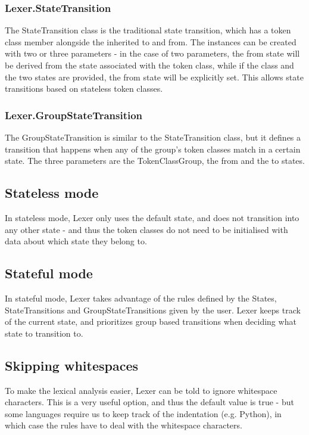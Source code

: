 \subsubsection{Lexer.StateTransition}
The StateTransition class is the traditional state transition, which has a token class member alongside the inherited to and from. The instances can be created with two or three parameters - in the case of two parameters, the from state will be derived from the state associated with the token class, while if the class and the two states are provided, the from state will be explicitly set. This allows state transitions based on stateless token classes.
\subsubsection{Lexer.GroupStateTransition} 
The GroupStateTransition is similar to the StateTransition class, but it defines a transition that happens when any of the group's token classes match in a certain state. The three parameters are the TokenClassGroup, the from and the to states.
\subsection{Stateless mode}
In stateless mode, Lexer only uses the default state, and does not transition into any other state - and thus the token classes do not need to be initialised with data about which state they belong to.
\subsection{Stateful mode}
In stateful mode, Lexer takes advantage of the rules defined by the States, StateTransitions and GroupStateTransitions given by the user. Lexer keeps track of the current state, and prioritizes group based transitions when deciding what state to transition to.
\subsection{Skipping whitespaces}
To make the lexical analysis easier, Lexer can be told to ignore whitespace characters. This is a very useful option, and thus the default value is true - but some languages require us to keep track of the indentation (e.g. Python), in which case the rules have to deal with the whitespace characters.
